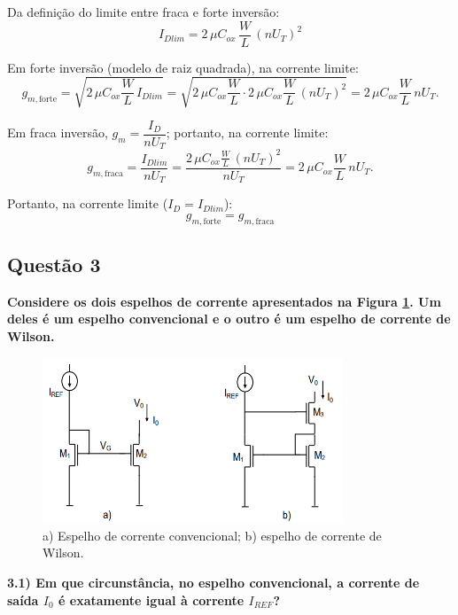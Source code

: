﻿\documentclass[12pt,a4paper]{article}
\begin{document}
Da definição do limite entre fraca e forte inversão:
\begin{equation}
I_{Dlim} = 2\,\mu C_{ox}\,\frac{W}{L}\,(nU_T)^2
\end{equation}

Em forte inversão (modelo de raiz quadrada), na corrente limite:
\begin{equation*}
g_{m,\text{forte}}=\sqrt{2\,\mu C_{ox}\frac{W}{L}\,I_{Dlim}}
=\sqrt{2\,\mu C_{ox}\frac{W}{L}\cdot 2\,\mu C_{ox}\frac{W}{L}\,(nU_T)^2}
=2\,\mu C_{ox}\frac{W}{L}\,nU_T.
\end{equation*}

Em fraca inversão, $g_m=\dfrac{I_D}{nU_T}$; portanto, na corrente limite:
\begin{equation*}
g_{m,\text{fraca}}=\frac{I_{Dlim}}{nU_T}
=\frac{2\,\mu C_{ox}\frac{W}{L}\,(nU_T)^2}{nU_T}
=2\,\mu C_{ox}\frac{W}{L}\,nU_T.
\end{equation*}

Portanto, na corrente limite ($I_D=I_{Dlim}$):
\begin{equation}
\boxed{g_{m,\text{forte}} = g_{m,\text{fraca}}}
\end{equation}

\subsection*{Questão 3}
\begin{BoxQ}
    \textbf{Considere os dois espelhos de corrente apresentados na Figura \ref{fig:espelhos_corrente}. Um deles é um espelho convencional e o outro é um espelho de corrente de Wilson.}
\end{BoxQ}\par

\begin{figure}[H]
    \centering
    \includegraphics[width=0.8\textwidth]{espelho_a_b.png}
    \caption{a) Espelho de corrente convencional; b) espelho de corrente de Wilson.}
    \label{fig:espelhos_corrente}
\end{figure}
\textbf{3.1) Em que circunstância, no espelho convencional, a corrente de saída $I_0$ é exatamente igual à corrente $I_{REF}$?}
\end{document}
